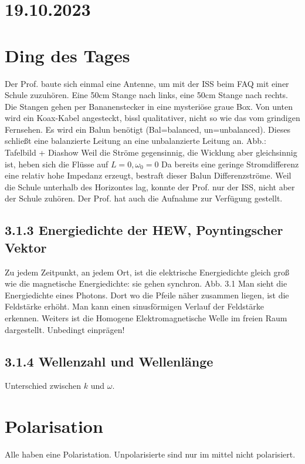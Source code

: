 \documentclass[a4paper]{article}
\begin{document}
\section*{19.10.2023}
\section*{Ding des Tages}
Der Prof. baute sich einmal eine Antenne, um mit der ISS beim FAQ mit einer Schule zuzuhören. Eine 50cm Stange nach links, eine 50cm Stange nach rechts. Die Stangen gehen per Bananenstecker in eine mysteriöse graue Box. Von unten wird ein Koax-Kabel angesteckt, bissl qualitativer, nicht so wie das vom grindigen Fernsehen.\newline
Es wird ein Balun benötigt (Bal=balanced, un=unbalanced). Dieses schließt eine balanzierte Leitung an eine unbalanzierte Leitung an.\newline
Abb.: Tafelbild + Diashow
Weil die Ströme gegensinnig, die Wicklung aber gleichsinnig ist, heben sich die Flüsse auf \implies $L=0, \omega_0=0$
Da bereits eine geringe Stromdifferenz eine relativ hohe Impedanz erzeugt, bestraft dieser Balun Differenzströme.\newline
Weil die Schule unterhalb des Horizontes lag, konnte der Prof. nur der ISS, nicht aber der Schule zuhören.
Der Prof. hat auch die Aufnahme zur Verfügung gestellt.

\subsection*{3.1.3 Energiedichte der HEW, Poyntingscher Vektor}
Zu jedem Zeitpunkt, an jedem Ort, ist die elektrische Energiedichte gleich groß wie die magnetische Energiedichte: sie gehen synchron.\newline
Abb. 3.1 Man sieht die Energiedichte eines Photons. Dort wo die Pfeile näher zusammen liegen, ist die Feldstärke erhöht. Man kann einen sinusförmigen Verlauf der Feldstärke erkennen.\newline
Weiters ist die Homogene Elektromagnetische Welle im freien Raum dargestellt. Unbedingt einprägen!\newline
\subsection*{3.1.4 Wellenzahl und Wellenlänge}
Unterschied zwischen $k$ und $\omega$.
\section*{Polarisation}
Alle haben eine Polaristation. Unpolarisierte sind nur im mittel nicht polarisiert.
\end{document}
